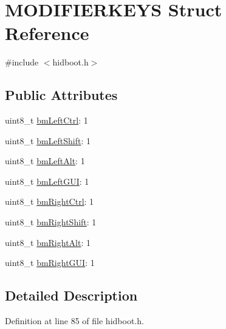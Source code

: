 \hypertarget{struct_m_o_d_i_f_i_e_r_k_e_y_s}{\section{\-M\-O\-D\-I\-F\-I\-E\-R\-K\-E\-Y\-S \-Struct \-Reference}
\label{struct_m_o_d_i_f_i_e_r_k_e_y_s}
}


{\ttfamily \#include $<$hidboot.\-h$>$}

\subsection*{\-Public \-Attributes}
\begin{DoxyCompactItemize}
\item 
uint8\-\_\-t \hyperlink{struct_m_o_d_i_f_i_e_r_k_e_y_s_a97b52e09ef7038a7e92b0e2993de3456}{bm\-Left\-Ctrl}\-: 1
\item 
uint8\-\_\-t \hyperlink{struct_m_o_d_i_f_i_e_r_k_e_y_s_acc2203f0a2cfd97605ba55698a74fef0}{bm\-Left\-Shift}\-: 1
\item 
uint8\-\_\-t \hyperlink{struct_m_o_d_i_f_i_e_r_k_e_y_s_a9831dc1526813627895b9244e5d85d83}{bm\-Left\-Alt}\-: 1
\item 
uint8\-\_\-t \hyperlink{struct_m_o_d_i_f_i_e_r_k_e_y_s_acb93172b755fe9c666fee166738089fe}{bm\-Left\-G\-U\-I}\-: 1
\item 
uint8\-\_\-t \hyperlink{struct_m_o_d_i_f_i_e_r_k_e_y_s_a8926773a958c27b996966489ecdf0da8}{bm\-Right\-Ctrl}\-: 1
\item 
uint8\-\_\-t \hyperlink{struct_m_o_d_i_f_i_e_r_k_e_y_s_ac6d2815eff37e625d1bd702b4712f4b3}{bm\-Right\-Shift}\-: 1
\item 
uint8\-\_\-t \hyperlink{struct_m_o_d_i_f_i_e_r_k_e_y_s_af4c772b51ef8ed4ec9863c4247f395c2}{bm\-Right\-Alt}\-: 1
\item 
uint8\-\_\-t \hyperlink{struct_m_o_d_i_f_i_e_r_k_e_y_s_a018fb06ba6da4b802895e6a945f8d041}{bm\-Right\-G\-U\-I}\-: 1
\end{DoxyCompactItemize}


\subsection{\-Detailed \-Description}


\-Definition at line 85 of file hidboot.\-h.



